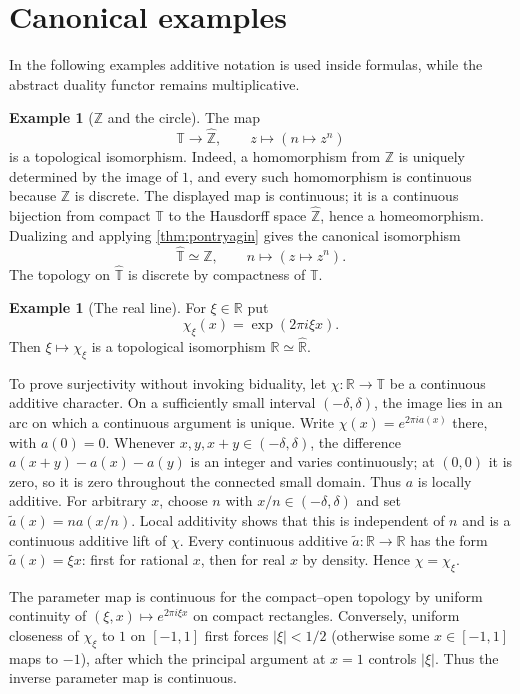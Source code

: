 \documentclass[11pt]{article}
\theoremstyle{definition}
\newtheorem{example}[theorem]{Example}
\theoremstyle{remark}
\newcommand{\T}{\mathbb T}
\newcommand{\R}{\mathbb R}
\newcommand{\Z}{\mathbb Z}
\newcommand{\dual}[1]{\widehat{#1}}
\newcommand{\abs}[1]{\lvert #1\rvert}
\begin{document}
\section{Canonical examples}
\label{sec:examples}

In the following examples additive notation is used inside formulas, while the abstract
duality functor remains multiplicative.

\begin{example}[$\Z$ and the circle]
\label{ex:Z-circle}
The map
\[
  \T\longrightarrow\dual\Z,
  \qquad z\longmapsto(n\mapsto z^n)
\]
is a topological isomorphism.  Indeed, a homomorphism from $\Z$ is uniquely determined
by the image of $1$, and every such homomorphism is continuous because $\Z$ is discrete.
The displayed map is continuous; it is a continuous bijection from compact $\T$ to the
Hausdorff space $\dual\Z$, hence a homeomorphism.  Dualizing and applying
\cref{thm:pontryagin} gives the canonical isomorphism
\[
  \dual\T\simeq\Z,
  \qquad n\longmapsto(z\mapsto z^n).
\]
The topology on $\dual\T$ is discrete by compactness of $\T$.
\end{example}

\begin{example}[The real line]
\label{ex:R}
For $\xi\in\R$ put
\[
  \chi_\xi(x)=\exp(2\pi i\xi x).
\]
Then $\xi\mapsto\chi_\xi$ is a topological isomorphism
$\R\simeq\dual\R$.

To prove surjectivity without invoking biduality, let $\chi:\R\to\T$ be a continuous
additive character.  On a sufficiently small interval $(-\delta,\delta)$, the image lies
in an arc on which a continuous argument is unique.  Write
$\chi(x)=e^{2\pi ia(x)}$ there, with $a(0)=0$.  Whenever
$x,y,x+y\in(-\delta,\delta)$, the difference
$a(x+y)-a(x)-a(y)$ is an integer and varies continuously; at $(0,0)$ it is zero, so it
is zero throughout the connected small domain.  Thus $a$ is locally additive.  For
arbitrary $x$, choose $n$ with $x/n\in(-\delta,\delta)$ and set
$\widetilde a(x)=na(x/n)$.  Local additivity shows that this is independent of $n$ and
is a continuous additive lift of $\chi$.  Every continuous additive
$\widetilde a:\R\to\R$ has the form $\widetilde a(x)=\xi x$: first for rational $x$,
then for real $x$ by density.  Hence $\chi=\chi_\xi$.

The parameter map is continuous for the compact--open topology by uniform continuity of
$(\xi,x)\mapsto e^{2\pi i\xi x}$ on compact rectangles.  Conversely, uniform closeness
of $\chi_\xi$ to $1$ on $[-1,1]$ first forces $\abs\xi<1/2$ (otherwise some
$x\in[-1,1]$ maps to $-1$), after which the principal argument at $x=1$ controls
$\abs\xi$.  Thus the inverse parameter map is continuous.
\end{example}
\end{document}
